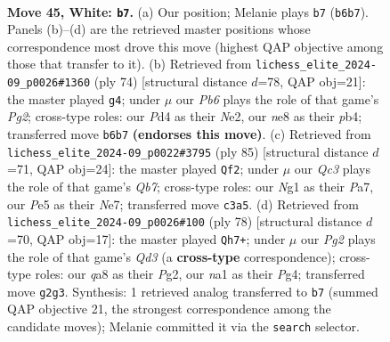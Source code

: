 \documentclass[11pt]{article}
\begin{document}
\clearpage

\begin{figure}[p]\centering
\begin{subfigure}{0.46\textwidth}\centering
\resizebox{\linewidth}{!}{%
\newchessgame
\chessboard[
  setfen={q3n3/3b2k1/pP6/4Pp1p/3P2p1/N1Q5/5PPP/n3K1N1 w - - 0 45},
  showmover=false,
  pgfstyle=straightmove, color=movearrow, markmove={b6-b7}
]}
\caption{}
\end{subfigure}\hfill
\begin{subfigure}{0.46\textwidth}\centering
\resizebox{\linewidth}{!}{%
\newchessgame
\chessboard[
  setfen={7k/3n3p/2bq4/2p3Pn/1pB1p2P/1P2Q3/1N2N1P1/6K1 w - - 0 38},
  showmover=false,
  pgfstyle=straightmove, color=movearrow, markmove={g2-g4}
]}
\caption{}
\end{subfigure}
\\[4pt]
\begin{subfigure}{0.46\textwidth}\centering
\resizebox{\linewidth}{!}{%
\newchessgame
\chessboard[
  setfen={8/p3npk1/7p/1p2P3/2p1QP2/2P4P/Pq6/6NK b - - 3 43},
  showmover=false,
  pgfstyle=straightmove, color=movearrow, markmove={b2-f2}
]}
\caption{}
\end{subfigure}\hfill
\begin{subfigure}{0.46\textwidth}\centering
\resizebox{\linewidth}{!}{%
\newchessgame
\chessboard[
  setfen={8/5k2/1n2p2p/1P1pP1q1/3P1pP1/3Q4/3N2P1/6K1 w - - 0 40},
  showmover=false,
  pgfstyle=straightmove, color=movearrow, markmove={d3-h7}
]}
\caption{}
\end{subfigure}
\caption{\textbf{Move 45, White: \texttt{b7}.} (a) Our position; Melanie plays \texttt{b7} (\texttt{b6b7}). Panels (b)--(d) are the retrieved master positions whose correspondence most drove this move (highest QAP objective among those that transfer to it). (b) Retrieved from \texttt{lichess\_elite\_2024-09\_p0026\#1360} (ply 74) [structural distance $d$=78, QAP obj=21]: the master played \texttt{g4}; under $\mu$ our \emph{Pb6} plays the role of that game's \emph{Pg2}; cross-type roles: our \emph{P}d4 as their \emph{N}e2, our \emph{n}e8 as their \emph{p}b4; transferred move \texttt{b6b7} \textbf{(endorses this move)}. (c) Retrieved from \texttt{lichess\_elite\_2024-09\_p0022\#3795} (ply 85) [structural distance $d$=71, QAP obj=24]: the master played \texttt{Qf2}; under $\mu$ our \emph{Qc3} plays the role of that game's \emph{Qb7}; cross-type roles: our \emph{N}g1 as their \emph{P}a7, our \emph{P}e5 as their \emph{N}e7; transferred move \texttt{c3a5}. (d) Retrieved from \texttt{lichess\_elite\_2024-09\_p0026\#100} (ply 78) [structural distance $d$=70, QAP obj=17]: the master played \texttt{Qh7+}; under $\mu$ our \emph{Pg2} plays the role of that game's \emph{Qd3} (a \textbf{cross-type} correspondence); cross-type roles: our \emph{q}a8 as their \emph{P}g2, our \emph{n}a1 as their \emph{P}g4; transferred move \texttt{g2g3}. Synthesis: 1 retrieved analog transferred to \texttt{b7} (summed QAP objective 21, the strongest correspondence among the candidate moves); Melanie committed it via the \texttt{search} selector.}
\label{fig:thought-m88}
\end{figure}
\end{document}
